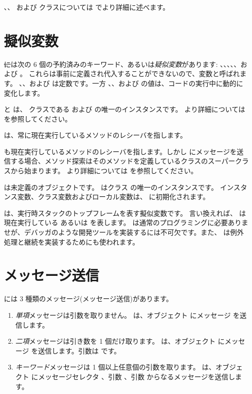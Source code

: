\documentclass[a4paper,10pt,twoside]{book}
\begin{document}
、、 および  クラスについては  でより詳細に述べます。


\section{擬似変数}

\st には次の 6 個の予約済みのキーワード、あるいは\emph{疑似変数}があります:
、、、、、および 。
これらは事前に定義され代入することができないので、変数と呼ばれます。
、、および  は定数です。一方 、、および  の値は、コードの実行中に動的に変化します。

 と  は、 クラスである  および  の唯一のインスタンスです。
より詳細については  を参照してください。

 は、常に現在実行しているメソッドのレシーバを指します。

 も現在実行しているメソッドのレシーバを指します。しかし \super にメッセージを送信する場合、メソッド探索はそのメソッドを定義しているクラスのスーパークラスから始まります。
より詳細については  を参照してください。

 は未定義のオブジェクトです。
 はクラス  の唯一のインスタンスです。
インスタンス変数、クラス変数およびローカル変数は、 に初期化されます。

 は、実行時スタックのトップフレームを表す擬似変数です。
言い換えれば、  は現在実行している  あるいは  を表します。
 は通常のプログラミングに必要ありませが、デバッガのような開発ツールを実装するには不可欠です。また、 は例外処理と継続を実装するためにも使われます。

\section{メッセージ送信}

\pharo には 3 種類のメッセージ(メッセージ送信)があります。
\begin{enumerate}
  \item \emph{単項}メッセージは引数を取りません。
  は、オブジェクト  にメッセージ  を送信します。
  \item \emph{二項}メッセージは引き数を 1 個だけ取ります。
  	 は、オブジェクト  にメッセージ \ct{+} を送信します。引数は  です。
  \item \emph{キーワード}メッセージは 1 個以上任意個の引数を取ります。
  	 は、オブジェクト  にメッセージセレクタ
	、引数 、引数  からなるメッセージを送信します。
\end{enumerate}
\end{document}
